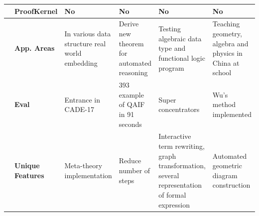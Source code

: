 \begin{table}[ht]
{\begin{tabular}{|p{}|p{}|p{4.2cm}|p{4.2cm}|p{4.2cm}|p{4.2cm}|}
 & \textbf{ProofKernel} & No & No & No & No \\ \hline
\parbox[t]{2mm}{} & \textbf{App. Areas} & In various data structure real world embedding 
& Derive new theorem for automated reasoning & Testing algebraic data type and functional logic program & Teaching geometry, algebra and physics in China at school \\
   & \textbf{Eval} & Entrance in CADE-17 & 393 example of QAIF in 91 seconds & Super concentrators & Wu's method implemented
   \\
& \textbf{Unique Features} & Meta-theory implementation & Reduce number of steps & Interactive term rewriting, graph transformation, 
several representation of formal expression & Automated geometric diagram construction
 \\
\hline
\end{tabular}
}
\label{Getfol and Goedel}
\end{table}

